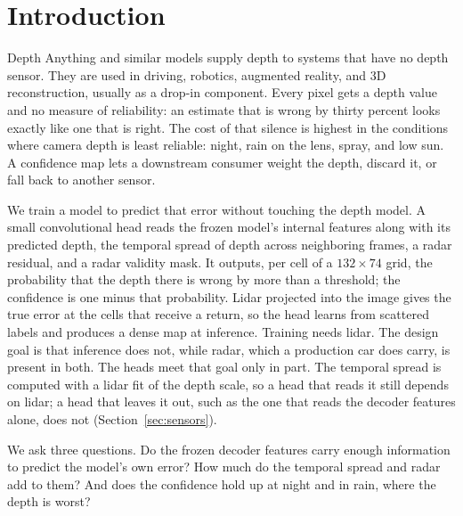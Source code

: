 %
\section{Introduction}
\label{sec:intro}

Depth Anything and similar models supply depth to systems that have no depth sensor. They are used in driving, robotics, augmented reality, and 3D reconstruction, usually as a drop-in component. Every pixel gets a depth value and no measure of reliability: an estimate that is wrong by thirty percent looks exactly like one that is right. The cost of that silence is highest in the conditions where camera depth is least reliable: night, rain on the lens, spray, and low sun. A confidence map lets a downstream consumer weight the depth, discard it, or fall back to another sensor.

We train a model to predict that error without touching the depth model. A small convolutional head reads the frozen model's internal features along with its predicted depth, the temporal spread of depth across neighboring frames, a radar residual, and a radar validity mask. It outputs, per cell of a $132 \times 74$ grid, the probability that the depth there is wrong by more than a threshold; the confidence is one minus that probability. Lidar projected into the image gives the true error at the cells that receive a return, so the head learns from scattered labels and produces a dense map at inference. Training needs lidar. The design goal is that inference does not, while radar, which a production car does carry, is present in both. The heads meet that goal only in part. The temporal spread is computed with a lidar fit of the depth scale, so a head that reads it still depends on lidar; a head that leaves it out, such as the one that reads the decoder features alone, does not (Section~\ref{sec:sensors}).

We ask three questions. Do the frozen decoder features carry enough information to predict the model's own error? How much do the temporal spread and radar add to them? And does the confidence hold up at night and in rain, where the depth is worst?

